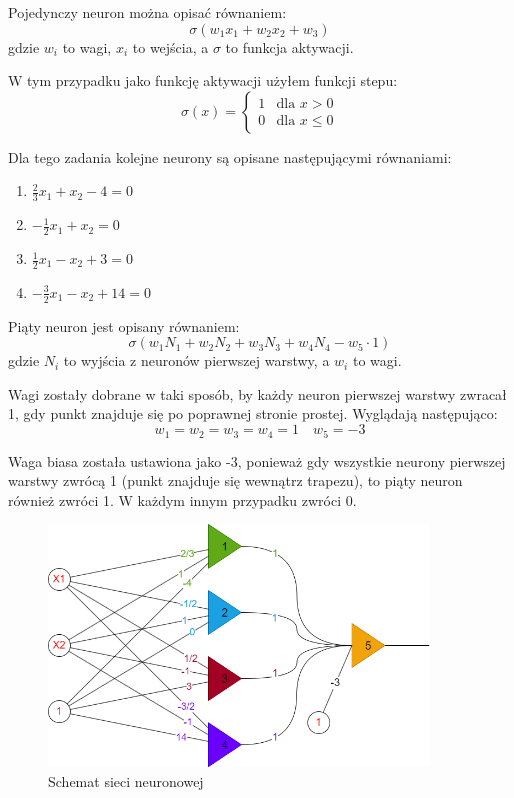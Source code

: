 \documentclass{article}
\begin{document}
Pojedynczy neuron można opisać równaniem:
\begin{equation}
    \sigma(w_1x_1 + w_2x_2 + w_3)
\end{equation}
gdzie $w_i$ to wagi, $x_i$ to wejścia, a $\sigma$ to funkcja
aktywacji. 

W tym przypadku jako funkcję aktywacji użyłem funkcji stepu:
\begin{equation}
    \sigma(x) = \begin{cases}
        1 & \text{dla } x > 0 \\
        0 & \text{dla } x \leq 0
    \end{cases}
\end{equation}

Dla tego zadania kolejne neurony są opisane następującymi równaniami:

\begin{enumerate}
    \centering
    \item $\frac{2}{3}x_1 + x_2 - 4 = 0$
    \item $-\frac{1}{2}x_1 + x_2 = 0$
    \item $\frac{1}{2}x_1 - x_2 + 3 = 0$
    \item $-\frac{3}{2}x_1 - x_2 + 14 = 0$
\end{enumerate}

Piąty neuron jest opisany równaniem:
\begin{equation}
    \sigma(w_1N_1 + w_2N_2 + w_3N_3 + w_4N_4 - w_5\cdot1)
\end{equation}
gdzie $N_i$ to wyjścia z neuronów pierwszej warstwy, a $w_i$ to wagi.

Wagi zostały dobrane w taki sposób, by każdy neuron pierwszej warstwy zwracał
1, gdy punkt znajduje się po poprawnej stronie prostej. Wyglądają następująco:
\begin{equation}
    w_1 = w_2 = w_3 = w_4 = 1 \quad w_5 = -3
\end{equation}

Waga biasa została ustawiona jako -3, ponieważ gdy wszystkie neurony
pierwszej warstwy zwrócą 1 (punkt znajduje się wewnątrz trapezu), to piąty
neuron również zwróci 1. W każdym innym przypadku zwróci 0.

\begin{figure}[H]
    \centering
    \includegraphics[width=0.9\textwidth]{sieć.png}
    \caption{Schemat sieci neuronowej}
\end{figure}
\end{document}
